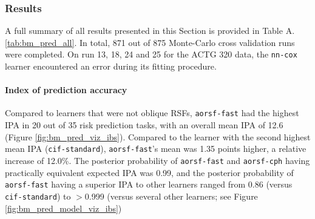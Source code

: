 \documentclass{article}\usepackage[]{graphicx}\usepackage[]{xcolor}
\newcommand{\tabrefAppendix}[1]{Table A.\ref{#1}}
\begin{document}
\subsubsection{Results} \label{sec:results_pred}

A full summary of all results presented in this Section is provided in \tabrefAppendix{tab:bm_pred_all}. In total, 871 out of 875 Monte-Carlo cross validation runs were completed. On run 13, 18, 24 and 25 for the ACTG 320 data, the \texttt{nn-cox} learner encountered an error during its fitting procedure.

\paragraph{Index of prediction accuracy}

Compared to learners that were not oblique RSFs, \texttt{aorsf-fast} had the highest IPA in 20 out of 35 risk prediction tasks, with an overall mean IPA of 12.6 (Figure \ref{fig:bm_pred_viz_ibs}). Compared to the learner with the second highest mean IPA (\texttt{cif-standard}), \texttt{aorsf-fast}'s mean was 1.35 points higher, a relative increase of 12.0\%. The posterior probability of \texttt{aorsf-fast} and \texttt{aorsf-cph} having practically equivalent expected IPA was 0.99, and the posterior probability of \texttt{aorsf-fast} having a superior IPA to other learners ranged from 0.86 (versus \texttt{cif-standard}) to $>$0.999 (versus several other learners; see Figure \ref{fig:bm_pred_model_viz_ibs})
\end{document}

